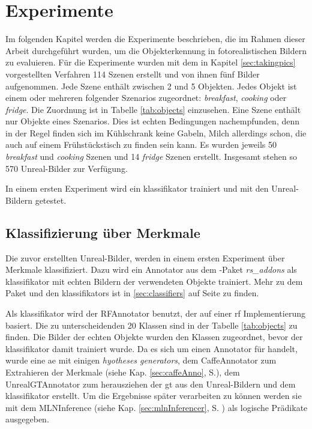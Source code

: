 \graphicspath{{./images/}}      
\def\CHAPTERONE{./chapters/Chapter-1} 

\chapter{Experimente}
\label{chap:experiments}
%	
\glsresetall
Im folgenden Kapitel werden die Experimente beschrieben, die im Rahmen dieser Arbeit durchgeführt wurden, um die Objekterkennung in fotorealistischen Bildern zu evaluieren. Für die Experimente wurden mit dem in Kapitel \ref{sec:takingpics} vorgestellten Verfahren 114 Szenen erstellt und von ihnen fünf Bilder aufgenommen. Jede Szene enthält zwischen 2 und 5 Objekten. Jedes Objekt ist einem oder mehreren folgender Szenarios zugeordnet: \textit{breakfast}, \textit{cooking} oder \textit{fridge}. Die Zuordnung ist in Tabelle \ref{tab:objects} einzusehen. Eine Szene enthält nur Objekte eines Szenarios. Dies ist echten Bedingungen nachempfunden, denn in der Regel finden sich im Kühlschrank keine Gabeln, Milch allerdings schon, die auch auf einem Frühstückstisch zu finden sein kann. Es wurden jeweils 50 \textit{breakfast} und \textit{cooking} Szenen und 14 \textit{fridge} Szenen erstellt. Insgesamt stehen so 570 Unreal-Bilder zur Verfügung. \par

In einem ersten Experiment wird ein \gls{klassifikator} trainiert und mit den Unreal-Bildern getestet.  


\section{Klassifizierung über Merkmale}
\label{sec:classificationExperiment}
Die zuvor erstellten Unreal-Bilder, werden in einem ersten Experiment über Merkmale klassifiziert. Dazu wird ein Annotator aus dem \robosherlock-Paket \textit{rs\_addons} als \gls{klassifikator} mit echten Bildern der verwendeten Objekte trainiert. Mehr zu dem Paket und den \glspl{klassifikator} ist in \ref{sec:classifiers} auf Seite \pageref{sec:classifiers} zu finden. \par

Als \gls{klassifikator} wird der RFAnnotator benutzt, der auf einer \gls{rf} Implementierung basiert. Die zu unterscheidenden 20 Klassen sind in der Tabelle \ref{tab:objects} zu finden. Die Bilder der echten Objekte wurden den Klassen zugeordnet, bevor der \gls{klassifikator} damit trainiert wurde. Da es sich um einen Annotator für \robosherlock handelt, wurde eine \gls{ae} mit einigen \textit{hyotheses generators}, dem CaffeAnnotator zum Extrahieren der Merkmale (siehe Kap. \ref{sec:caffeAnno}, S.\pageref{sec:caffeAnno}), dem UnrealGTAnnotator zum herausziehen der \gls{gt} aus den Unreal-Bildern und dem \gls{klassifikator} erstellt. Um die Ergebnisse später verarbeiten zu können werden sie mit dem MLNInference (siehe Kap. \ref{sec:mlnInferencer}, S. \pageref{sec:mlnInferencer}) als logische Prädikate ausgegeben. \par
 
